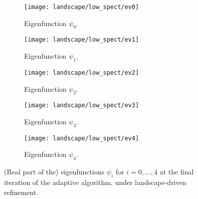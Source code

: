 \begin{figure}[htbp]
    \begin{subfigure}[t]{0.49\textwidth}
        \centering
        \texttt{[image: landscape/low\_spect/ev0]}
        \caption{Eigenfunction \(\psi_0\).}
        \label{fig:eigenfunction_0}
    \end{subfigure}
    \begin{subfigure}[t]{0.49\textwidth}
        \centering
        \texttt{[image: landscape/low\_spect/ev1]}
        \caption{Eigenfunction \(\psi_1\).}
        \label{fig:eigenfunction_1}
    \end{subfigure}
    \vspace{1cm}
    \begin{subfigure}[t]{0.49\textwidth}
        \centering
        \texttt{[image: landscape/low\_spect/ev2]}
        \caption{Eigenfunction \(\psi_2\).}
        \label{fig:eigenfunction_2}
    \end{subfigure}
    \begin{subfigure}[t]{0.49\textwidth}
        \centering
        \texttt{[image: landscape/low\_spect/ev3]}
        \caption{Eigenfunction \(\psi_3\).}
        \label{fig:eigenfunction_3}
    \end{subfigure}
    \vspace{1cm}
    \begin{subfigure}[t]{0.49\textwidth}
        \centering
        \texttt{[image: landscape/low\_spect/ev4]}
        \caption{Eigenfunction \(\psi_4\).}
        \label{fig:eigenfunction_4}
    \end{subfigure}
    \caption{(Real part of the) eigenfunctions \(\psi_i\) for \(i = 0, \ldots, 4\) at the final iteration of the adaptive algorithm, under landscape-driven refinement.}
\end{figure}

